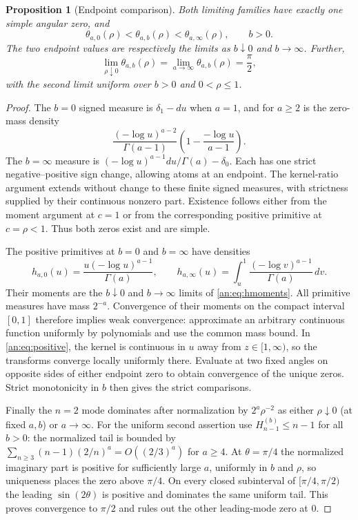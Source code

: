\documentclass[11pt]{article}
\numberwithin{equation}{section}
\theoremstyle{plain}
\newtheorem{proposition}[theorem]{Proposition}
\theoremstyle{definition}
\theoremstyle{remark}
\begin{document}
\begin{proposition}[Endpoint comparison]\label{an:prop:endpoints}
Both limiting families have exactly one simple angular zero, and
\[
 \theta_{a,0}(\rho)<\theta_{a,b}(\rho)
       <\theta_{a,\infty}(\rho),\qquad b>0.
\]
The two endpoint values are respectively the limits as $b\downarrow0$
and $b\to\infty$. Further,
\[
 \lim_{\rho\downarrow0}\theta_{a,b}(\rho)
 =\lim_{a\to\infty}\theta_{a,b}(\rho)=\frac\pi2,
\]
with the second limit uniform over $b>0$ and $0<\rho\le1$.
\end{proposition}
\begin{proof}
The $b=0$ signed measure is $\delta_1-du$ when $a=1$, and for
$a\ge2$ is the zero-mass density
\[
 \frac{(-\log u)^{a-2}}{\Gamma(a-1)}
 \left(1-\frac{-\log u}{a-1}\right).
\]
The $b=\infty$ measure is
$(-\log u)^{a-1}du/\Gamma(a)-\delta_0$.
Each has one strict negative--positive sign change, allowing atoms
at an endpoint. The kernel-ratio argument extends without change
to these finite signed measures, with strictness supplied by their
continuous nonzero part. Existence follows either from the moment
argument at $c=1$ or from the corresponding positive primitive at
$c=\rho<1$. Thus both zeros exist and are simple.

The positive primitives at $b=0$ and $b=\infty$ have densities
\[
 h_{a,0}(u)=\frac{u(-\log u)^{a-1}}{\Gamma(a)},\qquad
 h_{a,\infty}(u)=\int_u^1\frac{(-\log v)^{a-1}}{\Gamma(a)}\,dv.
\]
Their moments are the $b\downarrow0$ and $b\to\infty$ limits of
\eqref{an:eq:hmoments}. All primitive measures have mass $2^{-a}$.
Convergence of their moments on the compact interval $[0,1]$
therefore implies weak convergence: approximate an arbitrary
continuous function uniformly by polynomials and use the common
mass bound. In \eqref{an:eq:positive}, the kernel is continuous in
$u$ away from $z\in[1,\infty)$, so the transforms converge locally
uniformly there. Evaluate at two fixed angles on opposite sides of
either endpoint zero to obtain convergence of the unique zeros.
Strict monotonicity in $b$ then gives the strict comparisons.

Finally the $n=2$ mode dominates after normalization by
$2^a\rho^{-2}$ as either $\rho\downarrow0$ (at fixed $a,b$) or
$a\to\infty$. For the uniform second assertion use
$H_{n-1}^{(b)}\le n-1$ for all $b>0$: the normalized tail is
bounded by $\sum_{n\ge3}(n-1)(2/n)^a=O((2/3)^a)$ for $a\ge4$.
At $\theta=\pi/4$ the normalized imaginary part is positive for
sufficiently large $a$, uniformly in $b$ and $\rho$, so uniqueness
places the zero above $\pi/4$. On every closed subinterval of
$[\pi/4,\pi/2)$ the leading $\sin(2\theta)$ is positive and dominates
the same uniform tail. This proves convergence to $\pi/2$ and rules
out the other leading-mode zero at $0$.
\end{proof}
\end{document}

